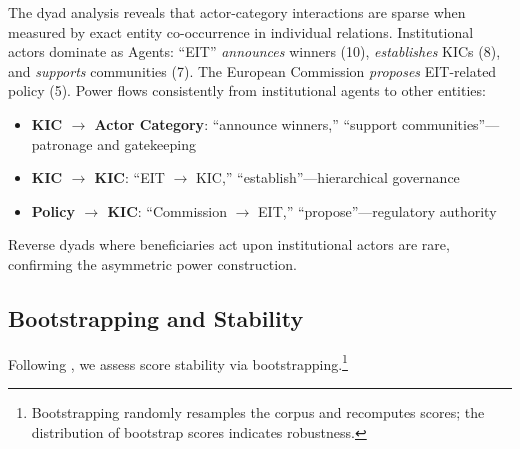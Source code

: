 \documentclass[../main.tex]{subfiles}
\begin{document}
The dyad analysis reveals that actor-category interactions are sparse when measured by exact entity co-occurrence in individual relations. Institutional actors dominate as Agents: ``EIT'' \textit{announces} winners (10), \textit{establishes} KICs (8), and \textit{supports} communities (7). The European Commission \textit{proposes} EIT-related policy (5). Power flows consistently from institutional agents to other entities:
\begin{itemize}
    \item \textbf{KIC $\rightarrow$ Actor Category}: ``announce winners,'' ``support communities''---patronage and gatekeeping
    \item \textbf{KIC $\rightarrow$ KIC}: ``EIT $\rightarrow$ KIC,'' ``establish''---hierarchical governance
    \item \textbf{Policy $\rightarrow$ KIC}: ``Commission $\rightarrow$ EIT,'' ``propose''---regulatory authority
\end{itemize}

Reverse dyads where beneficiaries act upon institutional actors are rare, confirming the asymmetric power construction.

\subsection{Bootstrapping and Stability}

Following \cite{antoniak2023riveter}, we assess score stability via bootstrapping.\footnote{Bootstrapping randomly resamples the corpus and recomputes scores; the distribution of bootstrap scores indicates robustness.}
\end{document}
